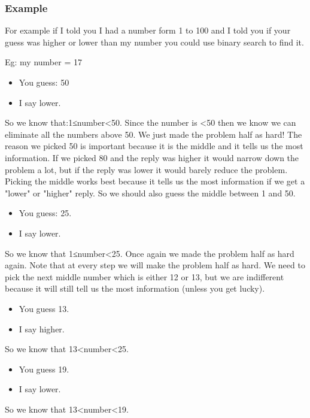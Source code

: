 \documentclass[11pt,oneside]{book}
\begin{document}
\subsubsection{Example}

For example if I told you I had a number form 1 to 100 and I told you if your guess was higher or lower than my number you could use binary search to find it.

Eg: my number = 17

\begin{itemize}
\item You guess: 50
\item I say lower.
\end{itemize}

So we know that:1≤number<50. Since the number is <50 then we know we can eliminate all the numbers above 50. We just made the problem half as hard! The reason we picked 50 is important because it is the middle and it tells us the most information. If we picked 80 and the reply was higher it would narrow down the problem a lot, but if the reply was lower it would barely reduce the problem. Picking the middle works best because it tells us the most information if we get a "lower" or "higher" reply. So we should also guess the middle between 1 and 50.

\begin{itemize}
\item You guess: 25.
\item I say lower.
\end{itemize}

So we know that 1≤number<25. Once again we made the problem half as hard again. Note that at every step we will make the problem half as hard. We need to pick the next middle number which is either 12 or 13, but we are indifferent because it will still tell us the most information (unless you get lucky).

\begin{itemize}
\item You guess 13.
\item I say higher.
\end{itemize}

So we know that 13<number<25.

\begin{itemize}
\item You guess 19.
\item I say lower.
\end{itemize}

So we know that 13<number<19.
\end{document}
